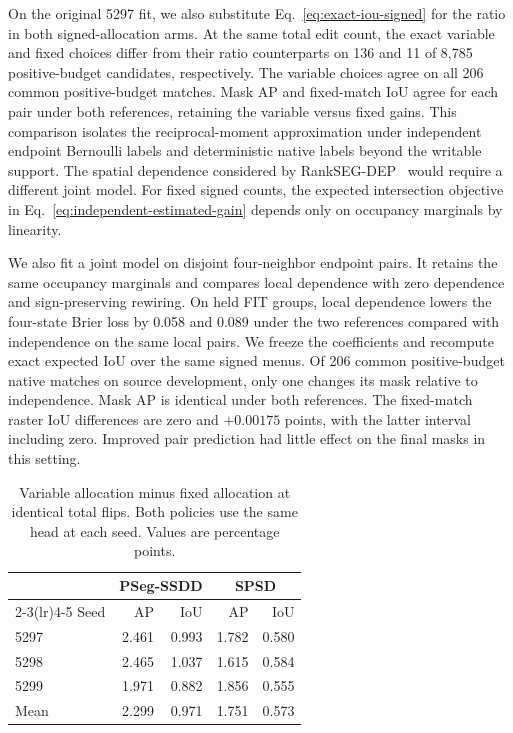 \documentclass[journal]{IEEEtran}
\begin{document}
On the original 5297 fit, we also substitute Eq.~\eqref{eq:exact-iou-signed} for the ratio in both signed-allocation arms. At the same total edit count, the exact variable and fixed choices differ from their ratio counterparts on 136 and 11 of 8,785 positive-budget candidates, respectively. The variable choices agree on all 206 common positive-budget matches. Mask AP and fixed-match IoU agree for each pair under both references, retaining the variable versus fixed gains. This comparison isolates the reciprocal-moment approximation under independent endpoint Bernoulli labels and deterministic native labels beyond the writable support. The spatial dependence considered by RankSEG-DEP~\cite{rankdep} would require a different joint model. For fixed signed counts, the expected intersection objective in Eq.~\eqref{eq:independent-estimated-gain} depends only on occupancy marginals by linearity.

We also fit a joint model on disjoint four-neighbor endpoint pairs. It retains the same occupancy marginals and compares local dependence with zero dependence and sign-preserving rewiring. On held FIT groups, local dependence lowers the four-state Brier loss by 0.058 and 0.089 under the two references compared with independence on the same local pairs. We freeze the coefficients and recompute exact expected IoU over the same signed menus. Of 206 common positive-budget native matches on source development, only one changes its mask relative to independence. Mask AP is identical under both references. The fixed-match raster IoU differences are zero and \(+0.00175\) points, with the latter interval including zero. Improved pair prediction had little effect on the final masks in this setting.

\begin{table}[t]
\centering
\caption{Variable allocation minus fixed allocation at identical total flips. Both policies use the same head at each seed. Values are percentage points.}
\label{tab:dual-sign-seeds}
\footnotesize
\begin{tabular}{@{}lrrrr@{}}
\toprule
 & \multicolumn{2}{c}{PSeg-SSDD} & \multicolumn{2}{c}{SPSD}\\
\cmidrule(lr){2-3}\cmidrule(lr){4-5}
Seed & AP & IoU & AP & IoU\\
\midrule
5297 & 2.461 & 0.993 & 1.782 & 0.580\\
5298 & 2.465 & 1.037 & 1.615 & 0.584\\
5299 & 1.971 & 0.882 & 1.856 & 0.555\\
\midrule
Mean & 2.299 & 0.971 & 1.751 & 0.573\\
\bottomrule
\end{tabular}
\end{table}
\end{document}
